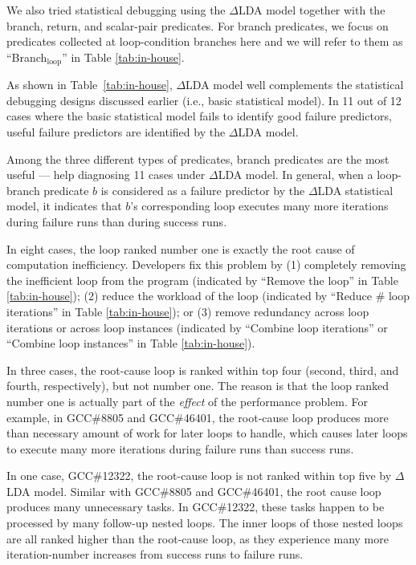



We also tried statistical debugging using the $\Delta$LDA model
together with the branch, return, and scalar-pair predicates. 
For branch predicates, we focus on predicates collected
at loop-condition branches here and we will refer to them as 
``Branch$_{\text{loop}}$'' in 
Table \ref{tab:in-house}.

As shown in Table~\ref{tab:in-house},
$\Delta$LDA model well complements the statistical debugging 
designs discussed earlier
(i.e., basic statistical model).
In 11 out of 12 cases where the basic statistical model fails to identify
good failure predictors, useful failure predictors are identified by
the $\Delta$LDA model.

Among the three different types of predicates, branch predicates are the
most useful --- help diagnosing 11 cases under $\Delta$LDA model. 
In general, when a loop-branch predicate $b$ is considered as a failure
predictor by the $\Delta$LDA statistical model, it indicates that $b$'s
corresponding loop executes many more iterations
during failure runs than during success runs.




In eight cases, the loop ranked number one is exactly the root cause of 
computation
inefficiency. Developers fix this problem by (1) completely removing the
inefficient loop from the program (indicated by ``Remove the loop'' in 
Table \ref{tab:in-house});  
(2) reduce the workload of the loop (indicated by ``Reduce \# loop iterations'' in Table \ref{tab:in-house}); or
(3) remove redundancy
across loop iterations or across loop instances
(indicated by ``Combine loop iterations'' or ``Combine loop instances'' in Table \ref{tab:in-house}).

In three cases, the root-cause loop is ranked within top four (second, third, 
and fourth, respectively), but not number one. The reason is that the loop
ranked number one is actually part of the \textit{effect} of the performance
problem. For example, in GCC\#8805 and GCC\#46401, the root-cause loop
produces more than necessary amount of work for later loops to handle, which
causes later loops to execute many more iterations during failure runs
than success runs.

In one case, GCC\#12322, the root-cause loop is not ranked within top five
by $\Delta$LDA model. Similar with GCC\#8805 and GCC\#46401, the root cause
loop produces many unnecessary tasks. In GCC\#12322, these tasks 
happen to be processed by many follow-up
nested loops. The inner loops of those nested loops are all ranked higher
than the root-cause loop, %
as they experience many more iteration-number 
increases from success runs to failure runs. 



